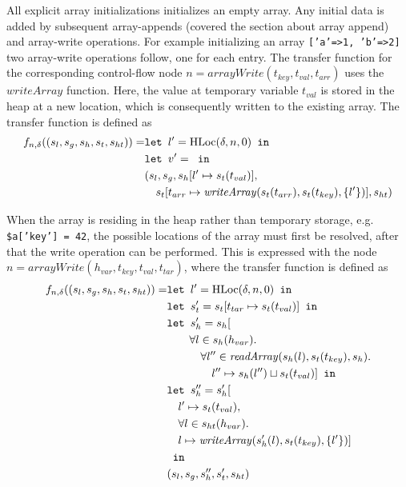 All explicit array initializations initializes an empty array. Any initial data is added by subsequent array-appends (covered the section about array append) and array-write operations. For example initializing an array \texttt{['a'=>1, 'b'=>2]} two array-write operations follow, one for each entry. The transfer function for the corresponding control-flow node $n = \mathit{arrayWrite}(t_{key},t_{val},t_{arr})$ uses the $\mathit{writeArray}$ function. Here, the value at temporary variable $t_{val}$ is stored in the heap at a new location, which is consequently written to the existing array. The transfer function is defined as
\begin{align}
f_{n,\delta}((s_l, s_g, s_h, s_t, s_{ht})) = & \texttt{let } l' = \text{HLoc}(\delta, n, 0) \texttt{ in }\notag\\
                            & \texttt{let } v' =  \texttt{ in }\notag\\
                            &(s_l, s_g, s_h[l'\mapsto s_t(t_{val})], \notag\\
                            &\quad s_t[t_{arr} \mapsto \mathit{writeArray}(s_t(t_{arr}), s_t(t_{key}), \{l'\})], s_{ht})
\end{align}

When the array is residing in the heap rather than temporary storage, e.g. \texttt{\$a['key'] = 42}, the possible locations of the array must first be resolved, after that the write operation can be performed. This is expressed with the node $n = \mathit{arrayWrite}(h_{var}, t_{key},t_{val},t_{tar})$, where the transfer function is defined as
\begin{align}
f_{n,\delta}((s_l, s_g, s_h, s_t, s_{ht})) = &\texttt{let } l' = \text{HLoc}(\delta, n, 0) \texttt{ in } \notag\\
                            &\texttt{let } s_t' = s_t[t_{tar}\mapsto s_t(t_{val})] \texttt{ in }\notag\\
                            &\texttt{let } s_h' =  s_h[\notag\\
                            &\quad\quad\forall l \in s_h(h_{var}).\notag\\
                            &\quad\quad\quad\forall l'' \in \mathit{readArray}(s_h(l), s_t(t_{key}), s_h).\notag\\
                            &\quad\quad\quad\quad l''\mapsto s_h(l'') \sqcup s_t(t_{val})] \texttt{ in }\notag\\
                            &\texttt{let } s_h'' = s_h'[\notag\\
                            &\quad l' \mapsto s_t(t_{val}), \notag\\
                            &\quad \forall l \in s_{ht}(h_{var}).\notag\\
                            &\quad l\mapsto \mathit{writeArray}(s_h'(l), s_t(t_{key}), \{l'\})]\notag\\
                            & \texttt{ in }\notag\\
                            &(s_l, s_g, s_h'', s_t', s_{ht})
\end{align}

